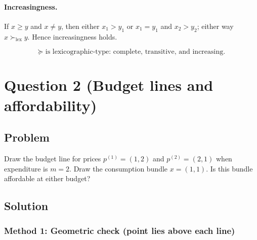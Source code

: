 \documentclass[12pt]{article}
\begin{document}
\paragraph{Increasingness.}
If \(x\ge y\) and \(x\neq y\), then either \(x_1>y_1\) or \(x_1=y_1\) and \(x_2>y_2\); either way \(x\succ_{\mathrm{lex}} y\). Hence increasingness holds.

\[
\boxed{\text{\(\succeq\) is lexicographic-type: complete, transitive, and increasing.}}
\]

\newpage
\section*{Question 2 (Budget lines and affordability)}
\subsection*{Problem}
Draw the budget line for prices \(p^{(1)}=(1,2)\) and \(p^{(2)}=(2,1)\) when expenditure is \(m=2\).
Draw the consumption bundle \(x=(1,1)\).
Is this bundle affordable at either budget?

\subsection*{Solution}

\subsubsection*{Method 1: Geometric check (point lies above each line)}
\end{document}
